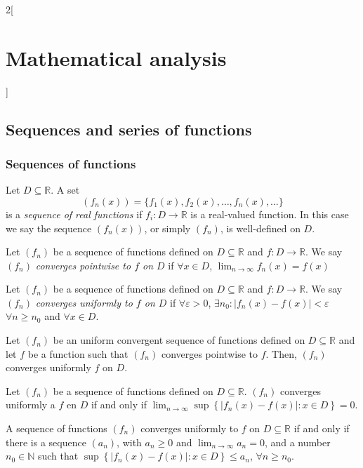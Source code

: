 \documentclass[../../../main.tex]{subfiles}
\begin{document}
\begin{multicols}{2}[\section{Mathematical analysis}]
\subsection{Sequences and series of functions}
\subsubsection*{Sequences of functions}
\begin{definition}
Let $D\subseteq\mathbb{R}$. A set $$(f_n(x))=\{f_1(x),f_2(x),\ldots,f_n(x),\ldots\}$$ is a \textit{sequence of real functions} if $f_i:D\rightarrow\mathbb{R}$ is a real-valued function. In this case we say the sequence $(f_n(x))$, or simply $(f_n)$, is well-defined on $D$.
\end{definition}
\begin{definition}
Let $(f_n)$ be a sequence of functions defined on $D\subseteq\mathbb{R}$ and $f:D\rightarrow\mathbb{R}$. We say $(f_n)$ \textit{converges pointwise to $f$ on $D$} if $\forall x\in D$, $\displaystyle\lim_{n\to\infty}f_n(x)=f(x)$
\end{definition}
\begin{definition}
Let $(f_n)$ be a sequence of functions defined on $D\subseteq\mathbb{R}$ and $f:D\rightarrow\mathbb{R}$. We say $(f_n)$ \textit{converges uniformly to $f$ on $D$} if $\forall\varepsilon>0$, $\exists n_0:|f_n(x)-f(x)|<\varepsilon$ $\forall n\geq n_0$ and $\forall x\in D$.
\end{definition}
\begin{lemma}
Let $(f_n)$ be an uniform convergent sequence of functions defined on $D\subseteq\mathbb{R}$ and let $f$ be a function such that $(f_n)$ converges pointwise to $f$. Then, $(f_n)$ converges uniformly $f$ on $D$.
\end{lemma}
\begin{lemma}
Let $(f_n)$ be a sequence of functions defined on $D\subseteq\mathbb{R}$. $(f_n)$ converges uniformly a $f$ en $D$ if and only if $\displaystyle \lim_{n\to\infty}\sup\left\{|f_n(x)-f(x)|:x\in D\right\}=0$.
\end{lemma}
\begin{corollary}
A sequence of functions $(f_n)$ converges uniformly to $f$ on $D\subseteq\mathbb{R}$ if and only if there is a sequence $(a_n)$, with $a_n\geq 0$ and $\displaystyle \lim_{n\to\infty} a_n=0$, and a number $\displaystyle n_0\in\mathbb{N}$ such that $\sup\left\{|f_n(x)-f(x)|: x\in D\right\}\leq a_n$, $\forall n\geq n_0$.
\end{corollary}
\begin{theorem}

\end{theorem}
\end{multicols}
\end{document}
